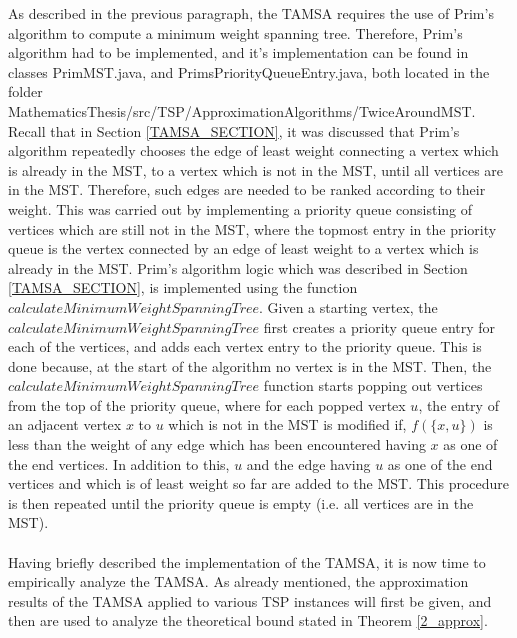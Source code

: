 \documentclass{article}
\begin{document}
As described in the previous paragraph, the TAMSA requires the use of Prim's algorithm to compute a minimum weight spanning tree. Therefore, Prim's algorithm had to be implemented, and it's implementation can be found in classes PrimMST.java, and PrimsPriorityQueueEntry.java, both located in the folder MathematicsThesis/src/TSP/ApproximationAlgorithms/TwiceAroundMST. Recall that in Section \ref{TAMSA_SECTION}, it was discussed that Prim's algorithm repeatedly chooses the edge of least weight connecting a vertex which is already in the MST, to a vertex which is not in the MST, until all vertices are in the MST. Therefore, such edges are needed to be ranked according to their weight. This was carried out by implementing a priority queue consisting of vertices which are still not in the MST, where the topmost entry in the priority queue is the vertex connected by an edge of least weight to a vertex which is already in the MST. Prim's algorithm logic which was described in Section \ref{TAMSA_SECTION}, is implemented using the function $calculateMinimumWeightSpanningTree$. Given a starting vertex, the $calculateMinimumWeightSpanningTree$ first creates a priority queue entry for each of the vertices, and adds each vertex entry to the priority queue. This is done because, at the start of the algorithm no vertex is in the MST. Then, the $calculateMinimumWeightSpanningTree$ function starts popping out vertices from the top of the priority queue, where for each popped vertex $u$, the entry of an adjacent vertex $x$ to $u$ which is not in the MST is modified if, $f(\{x,u\})$ is less than the weight of any edge which has been encountered having $x$ as one of the end vertices. In addition to this, $u$ and the edge having $u$ as one of the end vertices and which is of least weight so far are added to the MST. This procedure is then repeated until the priority queue is empty (i.e. all vertices are in the MST). \\\\
Having briefly described the implementation of the TAMSA, it is now time to empirically analyze the TAMSA. As already mentioned, the approximation results of the TAMSA applied to various TSP instances will first be given, and then are used to analyze the theoretical bound stated in Theorem \ref{2_approx}.
\end{document}
